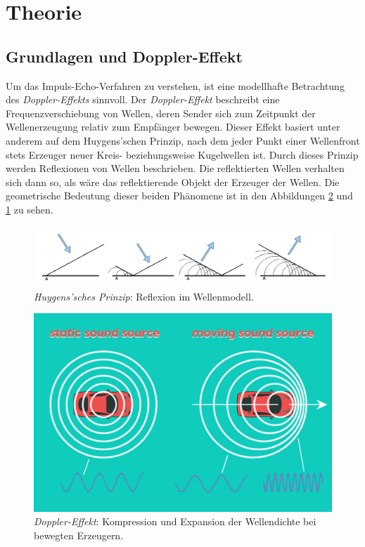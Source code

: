 \section{Theorie}
\label{sec:Theorie}
\subsection{Grundlagen und Doppler-Effekt}
Um das Impuls-Echo-Verfahren zu verstehen, ist eine modellhafte Betrachtung des \textit{Doppler-Effekts} sinnvoll.
Der \textit{Doppler-Effekt} beschreibt eine Frequenzverschiebung von Wellen, deren Sender sich zum Zeitpunkt der Wellenerzeugung relativ zum Empfänger bewegen.
Dieser Effekt basiert unter anderem auf dem Huygens'schen Prinzip, nach dem jeder Punkt einer Wellenfront stets Erzeuger neuer Kreis- beziehungsweise Kugelwellen ist.
Durch dieses Prinzip werden Reflexionen von Wellen beschrieben. Die reflektierten Wellen verhalten sich dann so, als wäre das reflektierende Objekt der Erzeuger der Wellen.
Die geometrische Bedeutung dieser beiden Phänomene ist in den Abbildungen \ref{fig:doppler} und \ref{fig:huygen} zu sehen.

\begin{figure}
    \centering
    \includegraphics[width=\textwidth]{media/Reflexion_im_Wellenmodell.png}
    \caption{\textit{Huygens'sches Prinzip}: Reflexion im Wellenmodell. \cite{huygens}}
    \label{fig:huygen}
\end{figure}

\begin{figure}
    \centering
    \includegraphics[width=.6\linewidth]{media/doppler-effect-header.jpg}
    \caption{\textit{Doppler-Effekt}: Kompression und Expansion der Wellendichte bei bewegten Erzeugern. \cite{doppler}}
    \label{fig:doppler}
\end{figure}

